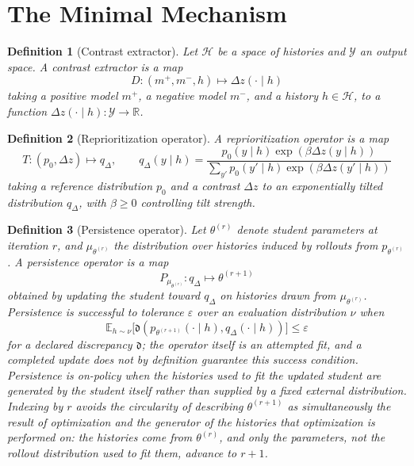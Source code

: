 \documentclass[11pt]{article}
\newtheorem{definition}{Definition}[section]
\begin{document}
\section{The Minimal Mechanism}

\begin{definition}[Contrast extractor]
Let $\mathcal{H}$ be a space of histories and $\mathcal{Y}$ an output space. A contrast extractor is a map
\[
D: (m^{+}, m^{-}, h) \mapsto \Delta z(\cdot \mid h)
\]
taking a positive model $m^{+}$, a negative model $m^{-}$, and a history $h \in \mathcal{H}$, to a function $\Delta z(\cdot \mid h): \mathcal{Y} \to \mathbb{R}$.
\end{definition}

\begin{definition}[Reprioritization operator]
A reprioritization operator is a map
\[
T: (p_0, \Delta z) \mapsto q_\Delta, \qquad q_\Delta(y \mid h) = \frac{p_0(y \mid h)\exp(\beta \Delta z(y \mid h))}{\sum_{y'} p_0(y' \mid h)\exp(\beta \Delta z(y' \mid h))}
\]
taking a reference distribution $p_0$ and a contrast $\Delta z$ to an exponentially tilted distribution $q_\Delta$, with $\beta \geq 0$ controlling tilt strength.
\end{definition}

\begin{definition}[Persistence operator]
Let $\theta^{(r)}$ denote student parameters at iteration $r$, and $\mu_{\theta^{(r)}}$ the distribution over histories induced by rollouts from $p_{\theta^{(r)}}$. A persistence operator is a map
\[
P_{\mu_{\theta^{(r)}}}: q_\Delta \mapsto \theta^{(r+1)}
\]
obtained by updating the student toward $q_\Delta$ on histories drawn from $\mu_{\theta^{(r)}}$. Persistence is \emph{successful to tolerance $\varepsilon$} over an evaluation distribution $\nu$ when
\[
\mathbb{E}_{h \sim \nu}\big[\mathfrak{d}(p_{\theta^{(r+1)}}(\cdot \mid h), q_\Delta(\cdot \mid h))\big] \leq \varepsilon
\]
for a declared discrepancy $\mathfrak{d}$; the operator itself is an attempted fit, and a completed update does not by definition guarantee this success condition. Persistence is \emph{on-policy} when the histories used to fit the updated student are generated by the student itself rather than supplied by a fixed external distribution. Indexing by $r$ avoids the circularity of describing $\theta^{(r+1)}$ as simultaneously the result of optimization and the generator of the histories that optimization is performed on: the histories come from $\theta^{(r)}$, and only the parameters, not the rollout distribution used to fit them, advance to $r+1$.
\end{definition}
\end{document}
